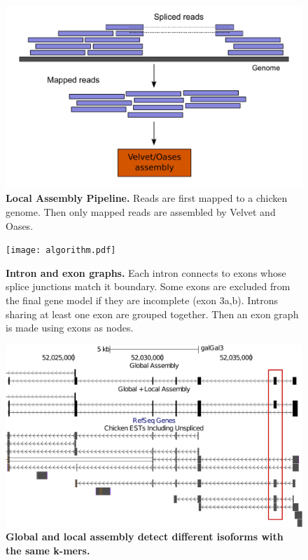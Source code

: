\documentclass[10pt]{article}
\begin{document}
\begin{figure}[!ht]
\begin{center}
\includegraphics[width=5in]{local_assembly}
\end{center}
\caption{
{\bf Local Assembly Pipeline.}
Reads are first mapped to a chicken genome.  Then only mapped reads are
assembled by Velvet and Oases.
}
\label{local_assembly}
\end{figure}

\begin{figure}[!ht]
\begin{center}
\texttt{[image: algorithm.pdf]}
\end{center}
\caption{
{\bf Intron and exon graphs.} Each intron connects to exons whose splice
junctions match it boundary.  Some exons are excluded from the final gene model
if they are incomplete (exon 3a,b).  Introns sharing at least one exon are
grouped together.  Then an exon graph is made using exons as nodes.
}
\label{algorithm}
\end{figure}

\begin{figure}[!ht]
\begin{center}
\includegraphics[width=5in]{global_vs_local.pdf}
\end{center}
\caption{
{\bf Global and local assembly detect different isoforms with the same k-mers.} 
}
\label{global_vs_local}
\end{figure}
\end{document}

